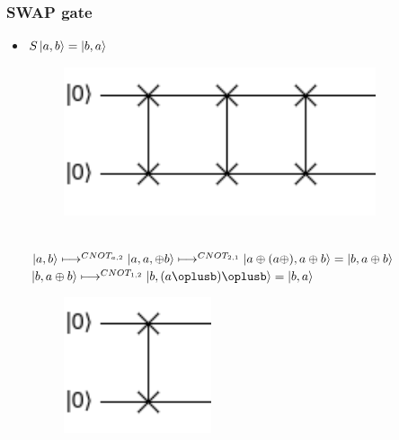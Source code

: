 \documentclass[11.5pt, paper=a4]{article}
\theoremstyle{definition}
\numberwithin{theorem}{section}
\begin{document}
\subsubsection{SWAP gate}
\begin{itemize}
    \item $S\ket{a,b} = \ket{b,a}$ \\
        \begin{figure}[h]
            \centering
            \includegraphics[scale=0.2]{images/SWAP 3.png}
        \end{figure}\\
        $\ket{a,b} \longmapsto^{CNOT_{a,2}} \ket{a, a,\oplus b} \longmapsto^{CNOT_{2,1}} \ket{a\oplus(a\oplus), a \oplus b} = \ket{b, a \oplus b}$ \\
        $ \ket{b, a \oplus b} \longmapsto^{CNOT_{1,2}} \ket{b, (a\oplusb)\oplusb} = \ket{b, a}$ \\
         \begin{figure}[h]
            \centering
            \includegraphics[scale=0.2]{images/SWAP 1.png}
        \end{figure}\\
\end{itemize}
\end{document}
